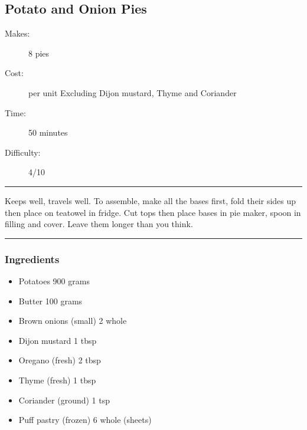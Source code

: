 \documentclass[]{article}
\begin{document}
\subsection*{\center\huge Potato and Onion Pies}
\begin{description}
\item[Makes:] 8 pies
\item[Cost:]  per unit Excluding Dijon mustard, Thyme and Coriander
\item[Time:] 50 minutes
\item[Difficulty:] 4/10
\end{description}
\vspace{0.2cm}\hrule\vspace{0.5cm}
\begin{adjustwidth}{0.5 cm}{0.5 cm}

Keeps well, travels well. To assemble, make all the bases first, fold their sides up then place on teatowel in fridge. Cut tops then place bases in pie maker, spoon in filling and cover. Leave them longer than you think. \hfill{}\color{black}

\end{adjustwidth}
\vspace{0.5cm}\hrule
\subsubsection*{\Large Ingredients}
\begin{multicols}{2}
\begin{itemize}
 \item Potatoes \hfill 900 grams
 \item Butter \hfill 100 grams
 \item Brown onions (small) \hfill 2 whole
 \item Dijon mustard \hfill 1 tbsp
 \item Oregano (fresh) \hfill 2 tbsp
 \item Thyme (fresh) \hfill 1 tbsp
 \item Coriander (ground) \hfill 1 tsp
 \item Puff pastry (frozen) \hfill 6 whole (sheets)
\end{itemize}
\end{multicols}
\end{document}
